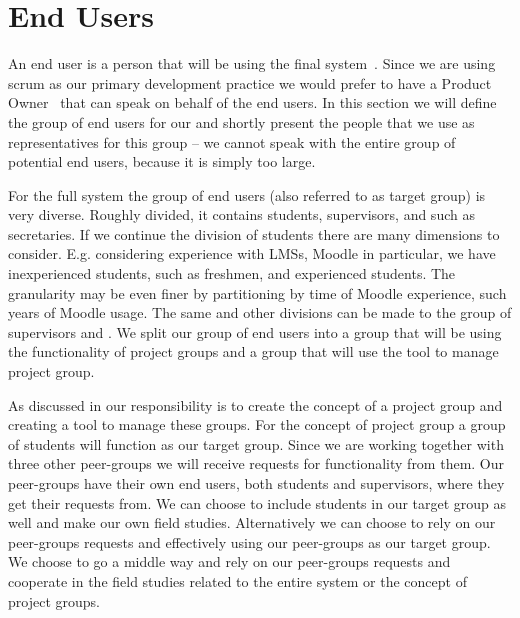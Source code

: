 \section{End Users}
\label{sec:enduser}
An end user is a person that will be using the final system~\cite{Larman04}.
Since we are using scrum as our primary development practice we would prefer to have a Product Owner~\cite{Larman04} that can speak on behalf of the end users.
In this section we will define the group of end users for our \subsystem{} and shortly present the people that we use as representatives for this group -- we cannot speak with the entire group of potential end users, because it is simply too large.

For the full system the group of end users (also referred to as target group) is very diverse.
Roughly divided, it contains students, supervisors, and \admpers{} such as secretaries.
If we continue the division of students there are many dimensions to consider. 
E.g. considering experience with LMSs, Moodle in particular, we have inexperienced students, such as freshmen, and experienced students.
The granularity may be even finer by partitioning by time of Moodle experience, such years of Moodle usage.
The same and other divisions can be made to the group of supervisors and \admpers{}.
We split our group of end users into a group that will be using the functionality of project groups and a group that will use the tool to manage project group.

As discussed in  our responsibility is to create the concept of a project group and creating a tool to manage these groups.
For the concept of project group a group of students will function as our target group.
Since we are working together with three other peer-groups we will receive requests for functionality from them.
Our peer-groups have their own end users, both students and supervisors, where they get their requests from.
We can choose to include students in our target group as well and make our own field studies.
Alternatively we can choose to rely on our peer-groups requests and effectively using our peer-groups as our target group.
We choose to go a middle way and rely on our peer-groups requests and cooperate in the field studies related to the entire system or the concept of project groups.

